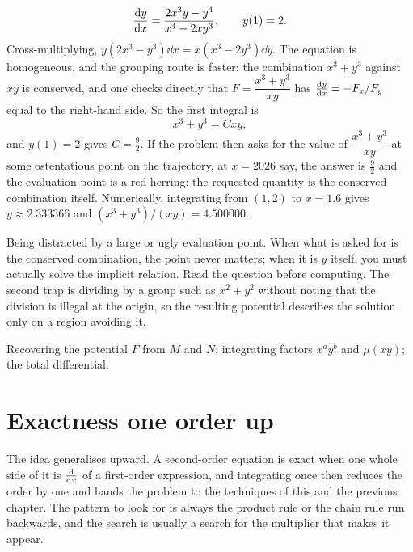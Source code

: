 \begin{worked}
\[\frac{\mathrm{d}y}{\mathrm{d}x}=\frac{2x^{3}y-y^{4}}{x^{4}-2xy^{3}},\qquad y(1)=2.\]
Cross-multiplying, $y(2x^{3}-y^{3})\dd x=x(x^{3}-2y^{3})\dd y$. The equation is homogeneous, and the grouping route is faster: the combination $x^{3}+y^{3}$ against $xy$ is conserved, and one checks directly that $F=\dfrac{x^{3}+y^{3}}{xy}$ has $\frac{\mathrm{d}y}{\mathrm{d}x}=-F_x/F_y$ equal to the right-hand side. So the first integral is
\[x^{3}+y^{3}=Cxy,\]
and $y(1)=2$ gives $C=\tfrac92$. If the problem then asks for the value of $\dfrac{x^{3}+y^{3}}{xy}$ at some ostentatious point on the trajectory, at $x=2026$ say, the answer is $\tfrac92$ and the evaluation point is a red herring: the requested quantity is the conserved combination itself. Numerically, integrating from $(1,2)$ to $x=1.6$ gives $y\approx2.333366$ and $(x^{3}+y^{3})/(xy)=4.500000$.
\end{worked}

\begin{trap}
Being distracted by a large or ugly evaluation point. When what is asked for is the conserved combination, the point never matters; when it is $y$ itself, you must actually solve the implicit relation. Read the question before computing. The second trap is dividing by a group such as $x^{2}+y^{2}$ without noting that the division is illegal at the origin, so the resulting potential describes the solution only on a region avoiding it.
\end{trap}

\begin{seealsob}Recovering the potential $F$ from $M$ and $N$; integrating factors $x^{a}y^{b}$ and $\mu(xy)$; the total differential.\end{seealsob}

\section{Exactness one order up}

The idea generalises upward. A second-order equation is exact when one whole side of it is $\frac{\mathrm{d}}{\mathrm{d}x}$ of a first-order expression, and integrating once then reduces the order by one and hands the problem to the techniques of this and the previous chapter. The pattern to look for is always the product rule or the chain rule run backwards, and the search is usually a search for the multiplier that makes it appear.

